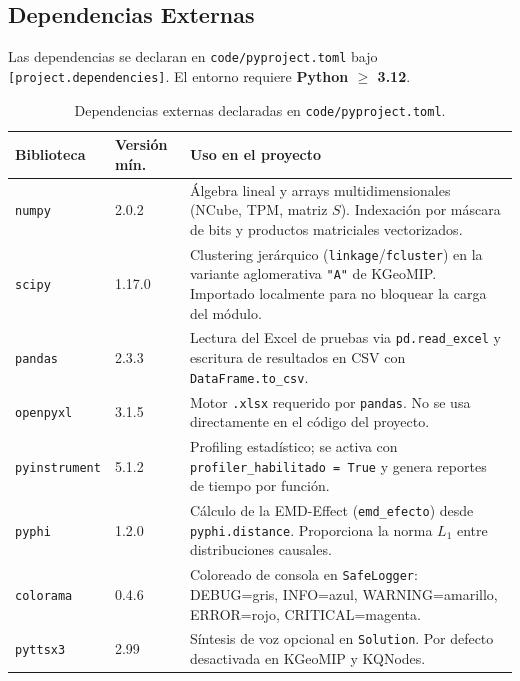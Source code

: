 \subsection{Dependencias Externas}

Las dependencias se declaran en \texttt{code/pyproject.toml} bajo
\texttt{[project.dependencies]}. El entorno requiere \textbf{Python $\ge$ 3.12}.

\begin{table}[H]
\centering
\begin{tabular}{llp{6.2cm}}
  \toprule
  \textbf{Biblioteca} & \textbf{Versión mín.} & \textbf{Uso en el proyecto} \\
  \midrule
  \texttt{numpy}        & 2.0.2  & Álgebra lineal y arrays multidimensionales
                                   (NCube, TPM, matriz $S$). Indexación por
                                   máscara de bits y productos matriciales vectorizados. \\
  \midrule
  \texttt{scipy}        & 1.17.0 & Clustering jerárquico
                                   (\texttt{linkage}/\texttt{fcluster}) en la variante
                                   aglomerativa \texttt{"A"} de KGeoMIP. Importado
                                   localmente para no bloquear la carga del módulo. \\
  \midrule
  \texttt{pandas}       & 2.3.3  & Lectura del Excel de pruebas via
                                   \texttt{pd.read\_excel} y escritura de resultados
                                   en CSV con \texttt{DataFrame.to\_csv}. \\
  \midrule
  \texttt{openpyxl}     & 3.1.5  & Motor \texttt{.xlsx} requerido por \texttt{pandas}.
                                   No se usa directamente en el código del proyecto. \\
  \midrule
  \texttt{pyinstrument} & 5.1.2  & Profiling estadístico; se activa con
                                   \texttt{profiler\_habilitado = True} y genera
                                   reportes de tiempo por función. \\
  \midrule
  \texttt{pyphi}        & 1.2.0  & Cálculo de la EMD-Effect (\texttt{emd\_efecto})
                                   desde \texttt{pyphi.distance}. Proporciona
                                   la norma $L_1$ entre distribuciones causales. \\
  \midrule
  \texttt{colorama}     & 0.4.6  & Coloreado de consola en \texttt{SafeLogger}:
                                   DEBUG=gris, INFO=azul, WARNING=amarillo,
                                   ERROR=rojo, CRITICAL=magenta. \\
  \midrule
  \texttt{pyttsx3}      & 2.99   & Síntesis de voz opcional en \texttt{Solution}.
                                   Por defecto desactivada en KGeoMIP y KQNodes. \\
  \bottomrule
\end{tabular}
\caption{Dependencias externas declaradas en \texttt{code/pyproject.toml}.}
\end{table}

